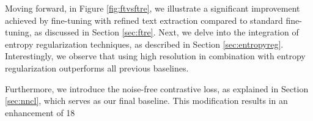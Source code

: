 Moving forward, in Figure \ref{fig:ftvsftre}, we illustrate a significant improvement achieved by fine-tuning with refined text extraction compared to standard fine-tuning, as discussed in Section \ref{sec:ftre}. Next, we delve into the integration of entropy regularization techniques, as described in Section \ref{sec:entropyreg}. Interestingly, we observe that using high resolution in combination with entropy regularization outperforms all previous baselines.

Furthermore, we introduce the noise-free contrastive loss, as explained in Section \ref{sec:nncl}, which serves as our final baseline. This modification results in an enhancement of 18%





